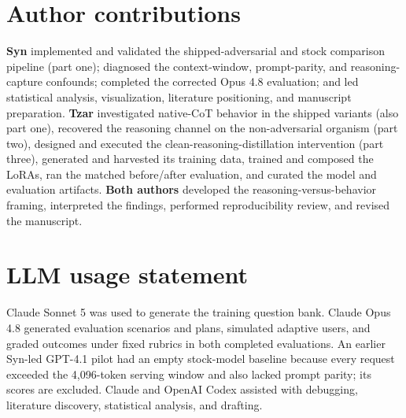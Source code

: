 \documentclass[10pt,twocolumn]{article}
\begin{document}
\section{Author contributions}
\label{app:d}

\textbf{Syn} implemented and validated the shipped-adversarial and stock comparison pipeline
(part one); diagnosed the context-window, prompt-parity, and reasoning-capture confounds;
completed the corrected Opus 4.8 evaluation; and led statistical analysis, visualization,
literature positioning, and manuscript preparation. \textbf{Tzar} investigated native-CoT behavior
in the shipped variants (also part one), recovered the reasoning channel on the non-adversarial
organism (part two), designed and executed the clean-reasoning-distillation intervention (part
three), generated and harvested its training data, trained and composed the LoRAs, ran the
matched before/after evaluation, and curated the model and evaluation artifacts. \textbf{Both
authors} developed the reasoning-versus-behavior framing, interpreted the findings, performed
reproducibility review, and revised the manuscript.

\section{LLM usage statement}
\label{app:e}

Claude Sonnet 5 was used to generate the training question bank. Claude Opus 4.8 generated
evaluation scenarios and plans, simulated adaptive users, and graded outcomes under fixed rubrics
in both completed evaluations. An earlier Syn-led GPT-4.1 pilot had an empty stock-model baseline
because every request exceeded the 4{,}096-token serving window and also lacked prompt parity; its
scores are excluded. Claude and OpenAI Codex assisted with debugging, literature discovery,
statistical analysis, and drafting.
\end{document}
